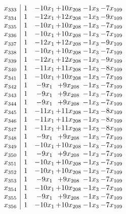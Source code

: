 \documentclass[11pt]{article}
\begin{document}
\[\begin{array}{c| c c@{\hskip 2pt} c@{\hskip 2pt} c@{\hskip 2pt} c@{\hskip 2pt} }
 x_{333}   &  1 & -10 x_{1} & + 10 x_{208} & -1 x_{3} & -7 x_{109}\\
 x_{334}   &  1 & -12 x_{1} & + 12 x_{208} & -1 x_{3} & -9 x_{109}\\
 x_{335}   &  1 & -10 x_{1} & + 10 x_{208} & -1 x_{3} & -7 x_{109}\\
 x_{336}   &  1 & -10 x_{1} & + 10 x_{208} & -1 x_{3} & -7 x_{109}\\
 x_{337}   &  1 & -12 x_{1} & + 12 x_{208} & -1 x_{3} & -9 x_{109}\\
 x_{338}   &  1 & -10 x_{1} & + 10 x_{208} & -1 x_{3} & -7 x_{109}\\
 x_{339}   &  1 & -12 x_{1} & + 12 x_{208} & -1 x_{3} & -9 x_{109}\\
 x_{340}   &  1 & -11 x_{1} & + 11 x_{208} & -1 x_{3} & -8 x_{109}\\
 x_{341}   &  1 & -10 x_{1} & + 10 x_{208} & -1 x_{3} & -7 x_{109}\\
 x_{342}   &  1 & -9 x_{1} & + 9 x_{208} & -1 x_{3} & -7 x_{109}\\
 x_{343}   &  1 & -9 x_{1} & + 9 x_{208} & -1 x_{3} & -7 x_{109}\\
 x_{344}   &  1 & -9 x_{1} & + 9 x_{208} & -1 x_{3} & -7 x_{109}\\
 x_{345}   &  1 & -11 x_{1} & + 11 x_{208} & -1 x_{3} & -8 x_{109}\\
 x_{346}   &  1 & -11 x_{1} & + 11 x_{208} & -1 x_{3} & -8 x_{109}\\
 x_{347}   &  1 & -11 x_{1} & + 11 x_{208} & -1 x_{3} & -8 x_{109}\\
 x_{348}   &  1 & -9 x_{1} & + 9 x_{208} & -1 x_{3} & -7 x_{109}\\
 x_{349}   &  1 & -10 x_{1} & + 10 x_{208} & -1 x_{3} & -7 x_{109}\\
 x_{350}   &  1 & -9 x_{1} & + 9 x_{208} & -1 x_{3} & -7 x_{109}\\
 x_{351}   &  1 & -10 x_{1} & + 10 x_{208} & -1 x_{3} & -7 x_{109}\\
 x_{352}   &  1 & -10 x_{1} & + 10 x_{208} & -1 x_{3} & -7 x_{109}\\
 x_{353}   &  1 & -9 x_{1} & + 9 x_{208} & -1 x_{3} & -7 x_{109}\\
 x_{354}   &  1 & -10 x_{1} & + 10 x_{208} & -1 x_{3} & -7 x_{109}\\
 x_{355}   &  1 & -9 x_{1} & + 9 x_{208} & -1 x_{3} & -7 x_{109}\\
 x_{356}   &  1 & -10 x_{1} & + 10 x_{208} & -1 x_{3} & -7 x_{109}\\

\end{array}\]
\end{document}
